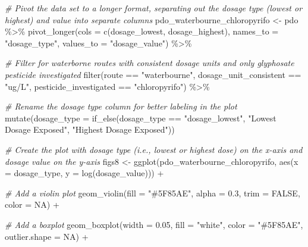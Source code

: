 \documentclass[
]{article}
\newenvironment{Shaded}{\begin{snugshade}}{\end{snugshade}}
\newcommand{\AttributeTok}[1]{\textcolor[rgb]{0.77,0.63,0.00}{#1}}
\newcommand{\CommentTok}[1]{\textcolor[rgb]{0.56,0.35,0.01}{\textit{#1}}}
\newcommand{\ConstantTok}[1]{\textcolor[rgb]{0.00,0.00,0.00}{#1}}
\newcommand{\FloatTok}[1]{\textcolor[rgb]{0.00,0.00,0.81}{#1}}
\newcommand{\FunctionTok}[1]{\textcolor[rgb]{0.00,0.00,0.00}{#1}}
\newcommand{\NormalTok}[1]{#1}
\newcommand{\OtherTok}[1]{\textcolor[rgb]{0.56,0.35,0.01}{#1}}
\newcommand{\SpecialCharTok}[1]{\textcolor[rgb]{0.00,0.00,0.00}{#1}}
\newcommand{\StringTok}[1]{\textcolor[rgb]{0.31,0.60,0.02}{#1}}
\begin{document}
\begin{Shaded}
\begin{Highlighting}[]
\CommentTok{\# Pivot the data set to a longer format, separating out the dosage type (lowest or highest) and value into separate columns}
\NormalTok{pdo\_waterbourne\_chloropyrifo }\OtherTok{\textless{}{-}}\NormalTok{ pdo }\SpecialCharTok{\%\textgreater{}\%}
  \FunctionTok{pivot\_longer}\NormalTok{(}\AttributeTok{cols =} \FunctionTok{c}\NormalTok{(dosage\_lowest, dosage\_highest), }
               \AttributeTok{names\_to =} \StringTok{"dosage\_type"}\NormalTok{,}
               \AttributeTok{values\_to =} \StringTok{"dosage\_value"}\NormalTok{) }\SpecialCharTok{\%\textgreater{}\%} 
  
  \CommentTok{\# Filter for waterborne routes with consistent dosage units and only glyphosate pesticide investigated}
  \FunctionTok{filter}\NormalTok{(route }\SpecialCharTok{==} \StringTok{"waterbourne"}\NormalTok{, dosage\_unit\_consistent }\SpecialCharTok{==} \StringTok{"ug/L"}\NormalTok{, pesticide\_investigated }\SpecialCharTok{==} \StringTok{"chloropyrifo"}\NormalTok{) }\SpecialCharTok{\%\textgreater{}\%}  
  
  \CommentTok{\# Rename the dosage type column for better labeling in the plot}
  \FunctionTok{mutate}\NormalTok{(}\AttributeTok{dosage\_type =} \FunctionTok{if\_else}\NormalTok{(dosage\_type }\SpecialCharTok{==} \StringTok{"dosage\_lowest"}\NormalTok{, }\StringTok{"Lowest Dosage Exposed"}\NormalTok{, }\StringTok{"Highest Dosage Exposed"}\NormalTok{))}

\CommentTok{\# Create the plot with dosage type (i.e., lowest or highest dose) on the x{-}axis and dosage value on the y{-}axis}
\NormalTok{figs8 }\OtherTok{\textless{}{-}} \FunctionTok{ggplot}\NormalTok{(pdo\_waterbourne\_chloropyrifo, }\FunctionTok{aes}\NormalTok{(}\AttributeTok{x =}\NormalTok{ dosage\_type, }\AttributeTok{y =} \FunctionTok{log}\NormalTok{(dosage\_value))) }\SpecialCharTok{+}
  
  \CommentTok{\# Add a violin plot}
  \FunctionTok{geom\_violin}\NormalTok{(}\AttributeTok{fill =} \StringTok{"\#5F85AE"}\NormalTok{, }\AttributeTok{alpha =} \FloatTok{0.3}\NormalTok{, }\AttributeTok{trim =} \ConstantTok{FALSE}\NormalTok{, }\AttributeTok{color =} \ConstantTok{NA}\NormalTok{) }\SpecialCharTok{+}
  
  \CommentTok{\# Add a boxplot}
  \FunctionTok{geom\_boxplot}\NormalTok{(}\AttributeTok{width =} \FloatTok{0.05}\NormalTok{, }\AttributeTok{fill =} \StringTok{"white"}\NormalTok{, }\AttributeTok{color =} \StringTok{"\#5F85AE"}\NormalTok{, }\AttributeTok{outlier.shape =} \ConstantTok{NA}\NormalTok{) }\SpecialCharTok{+}
  

\end{Highlighting}
\end{Shaded}
\end{document}
